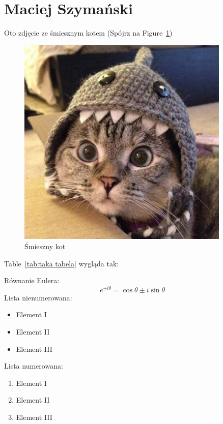 \newpage
\section{Maciej Szymański}

\vspace{1 cm}

Oto zdjęcie ze śmiesznym kotem (Spójrz na Figure~\ref{fig:Funny cat})
\begin{figure}[htbp]
    \centering
    \includegraphics[width=0.9\textwidth]{pictures/funny_cat.jpg}
    \caption{Śmieszny kot}
    \label{fig:Funny cat}
\end{figure}

Table~\ref{tab:taka tabela} wygląda tak:


Równanie Eulera:
\[e^{ \pm i\theta } = \cos \theta \pm i\sin \theta\]
\newpage
Lista nienumerowana:
\begin{itemize}
  \item Element I
  \item Element II
  \item Element III
\end{itemize}

\vspace{0.5 cm}

Lista numerowana:
\begin{enumerate}
  \item Element I
  \item Element II
  \item Element III
\end{enumerate}

